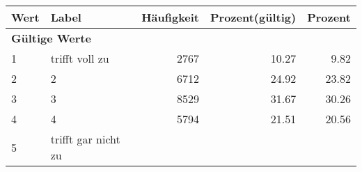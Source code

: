      \begin{longtable}{lXrrr}
     \toprule
     \textbf{Wert} & \textbf{Label} & \textbf{Häufigkeit} & \textbf{Prozent(gültig)} & \textbf{Prozent} \\
     \endhead
     \midrule
     \multicolumn{5}{l}{\textbf{Gültige Werte}}\\

     1 &
     \multicolumn{1}{X}{ trifft voll zu   } &


       \num{2767} &
       \num[round-mode=places,round-precision=2]{10,27} &
         \num[round-mode=places,round-precision=2]{9,82} \\

     2 &
     \multicolumn{1}{X}{ 2   } &


       \num{6712} &
       \num[round-mode=places,round-precision=2]{24,92} &
         \num[round-mode=places,round-precision=2]{23,82} \\

     3 &
     \multicolumn{1}{X}{ 3   } &


       \num{8529} &
       \num[round-mode=places,round-precision=2]{31,67} &
         \num[round-mode=places,round-precision=2]{30,26} \\

     4 &
     \multicolumn{1}{X}{ 4   } &


       \num{5794} &
       \num[round-mode=places,round-precision=2]{21,51} &
         \num[round-mode=places,round-precision=2]{20,56} \\

     5 &
     \multicolumn{1}{X}{ trifft gar nicht zu   } &



\end{longtable}
